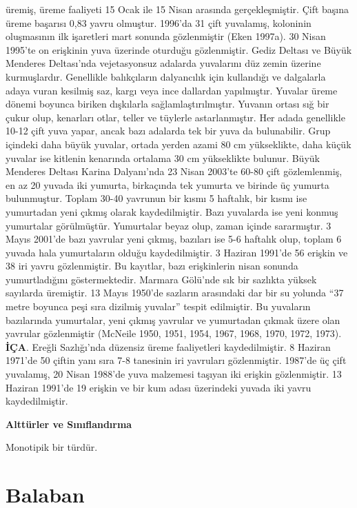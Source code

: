 \documentclass[
  letterpaper,
  DIV=11,
  numbers=noendperiod]{scrreprt}
\begin{document}
üremiş, üreme faaliyeti 15 Ocak ile 15 Nisan arasında gerçekleşmiştir.
Çift başına üreme başarısı 0,83 yavru olmuştur. 1996'da 31 çift
yuvalamış, koloninin oluşmasının ilk işaretleri mart sonunda
gözlenmiştir (Eken 1997a). 30 Nisan 1995'te on erişkinin yuva üzerinde
oturduğu gözlenmiştir. Gediz Deltası ve Büyük Menderes Deltası'nda
vejetasyonsuz adalarda yuvalarını düz zemin üzerine kurmuşlardır.
Genellikle balıkçıların dalyancılık için kullandığı ve dalgalarla adaya
vuran kesilmiş saz, kargı veya ince dallardan yapılmıştır. Yuvalar üreme
dönemi boyunca biriken dışkılarla sağlamlaştırılmıştır. Yuvanın ortası
sığ bir çukur olup, kenarları otlar, teller ve tüylerle astarlanmıştır.
Her adada genellikle 10-12 çift yuva yapar, ancak bazı adalarda tek bir
yuva da bulunabilir. Grup içindeki daha büyük yuvalar, ortada yerden
azami 80 cm yükseklikte, daha küçük yuvalar ise kitlenin kenarında
ortalama 30 cm yükseklikte bulunur. Büyük Menderes Deltası Karina
Dalyanı'nda 23 Nisan 2003'te 60-80 çift gözlemlenmiş, en az 20 yuvada
iki yumurta, birkaçında tek yumurta ve birinde üç yumurta bulunmuştur.
Toplam 30-40 yavrunun bir kısmı 5 haftalık, bir kısmı ise yumurtadan
yeni çıkmış olarak kaydedilmiştir. Bazı yuvalarda ise yeni konmuş
yumurtalar görülmüştür. Yumurtalar beyaz olup, zaman içinde sararmıştır.
3 Mayıs 2001'de bazı yavrular yeni çıkmış, bazıları ise 5-6 haftalık
olup, toplam 6 yuvada hala yumurtaların olduğu kaydedilmiştir. 3 Haziran
1991'de 56 erişkin ve 38 iri yavru gözlenmiştir. Bu kayıtlar, bazı
erişkinlerin nisan sonunda yumurtladığını göstermektedir. Marmara
Gölü'nde sık bir sazlıkta yüksek sayılarda üremiştir. 13 Mayıs 1950'de
sazların arasındaki dar bir su yolunda ``37 metre boyunca peşi sıra
dizilmiş yuvalar'' tespit edilmiştir. Bu yuvaların bazılarında
yumurtalar, yeni çıkmış yavrular ve yumurtadan çıkmak üzere olan
yavrular gözlenmiştir (McNeile 1950, 1951, 1954, 1967, 1968, 1970, 1972,
1973). \textbf{İÇA}. Ereğli Sazlığı'nda düzensiz üreme faaliyetleri
kaydedilmiştir. 8 Haziran 1971'de 50 çiftin yanı sıra 7-8 tanesinin iri
yavruları gözlenmiştir. 1987'de üç çift yuvalamış, 20 Nisan 1988'de yuva
malzemesi taşıyan iki erişkin gözlenmiştir. 13 Haziran 1991'de 19
erişkin ve bir kum adası üzerindeki yuvada iki yavru kaydedilmiştir.

\textbf{Alttürler ve Sınıflandırma}

Monotipik bir türdür.

\section{Balaban}\label{balaban}
\end{document}
